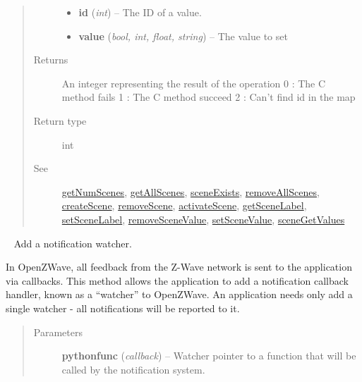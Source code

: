 \documentclass[letterpaper,10pt,english]{sphinxmanual}
\begin{document}
\begin{fulllineitems}
\begin{fulllineitems}
\begin{quote}
\begin{description}
\begin{itemize}
\item {} 
\textbf{id} (\emph{int}) -- The ID of a value.

\item {} 
\textbf{value} (\emph{bool, int, float, string}) -- The value to set

\end{itemize}

\item[{Returns}] \leavevmode
An integer representing the result of the operation
0 : The C method fails
1 : The C method succeed
2 : Can't find id in the map

\item[{Return type}] \leavevmode
int

\item[{See}] \leavevmode
{\hyperref[libopenzwave:getnumscenes]{getNumScenes}}, {\hyperref[libopenzwave:getallscenes]{getAllScenes}}, {\hyperref[libopenzwave:sceneexists]{sceneExists}}, {\hyperref[libopenzwave:removeallscenes]{removeAllScenes}}, {\hyperref[libopenzwave:createscene]{createScene}}, {\hyperref[libopenzwave:removescene]{removeScene}}, {\hyperref[libopenzwave:activatescene]{activateScene}}, {\hyperref[libopenzwave:getscenelabel]{getSceneLabel}}, {\hyperref[libopenzwave:setscenelabel]{setSceneLabel}}, {\hyperref[libopenzwave:removescenevalue]{removeSceneValue}}, {\hyperref[libopenzwave:setscenevalue]{setSceneValue}}, {\hyperref[libopenzwave:scenegetvalues]{sceneGetValues}}

\end{description}\end{quote}

\end{fulllineitems}


\begin{fulllineitems}
\label{libopenzwave:libopenzwave.PyManager.addWatcher}~\label{libopenzwave:addwatcher}
Add a notification watcher.

In OpenZWave, all feedback from the Z-Wave network is sent to the application
via callbacks.  This method allows the application to add a notification
callback handler, known as a ``watcher'' to OpenZWave.  An application needs only
add a single watcher - all notifications will be reported to it.
\begin{quote}\begin{description}
\item[{Parameters}] \leavevmode
\textbf{pythonfunc} (\emph{callback}) -- Watcher pointer to a function that will be called by the notification system.


\end{description}
\end{quote}
\end{fulllineitems}
\end{fulllineitems}
\end{document}
